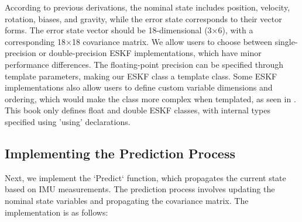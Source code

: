 According to previous derivations, the nominal state includes position, velocity, rotation, biases, and gravity, while the error state corresponds to their vector forms. The error state vector should be 18-dimensional (3×6), with a corresponding 18×18 covariance matrix. We allow users to choose between single-precision or double-precision ESKF implementations, which have minor performance differences. The floating-point precision can be specified through template parameters, making our ESKF class a template class. Some ESKF implementations also allow users to define custom variable dimensions and ordering, which would make the class more complex when templated, as seen in \cite{Hertzberg2013}. This book only defines float and double ESKF classes, with internal types specified using 'using' declarations.
\subsection{Implementing the Prediction Process}  

Next, we implement the `Predict` function, which propagates the current state based on IMU measurements. The prediction process involves updating the nominal state variables and propagating the covariance matrix. The implementation is as follows:  

